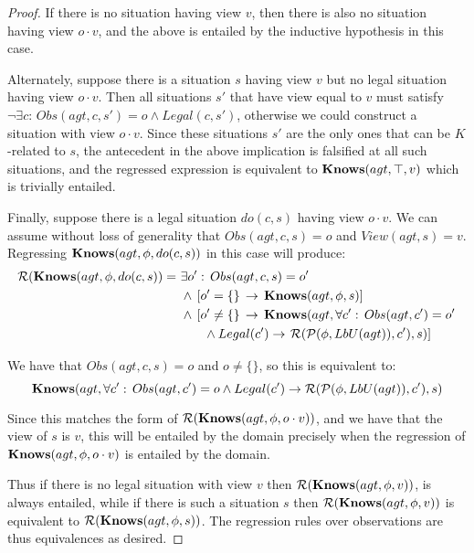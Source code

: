 \begin{proof}
If there is no situation having view $v$, then there is also no situation
having view $o\cdot v$, and the above is entailed by the inductive
hypothesis in this case.

Alternately, suppose there is a situation $s$ having view $v$ but
no legal situation having view $o\cdot v$. Then all situations $s'$
that have view equal to $v$ must satisfy $\neg\exists c:\, Obs(agt,c,s')=o\wedge Legal(c,s')$,
otherwise we could construct a situation with view $o\cdot v$. Since
these situations $s'$ are the only ones that can be $K$-related
to $s$, the antecedent in the above implication is falsified at all
such situations, and the regressed expression is equivalent to $\mathbf{Knows}(agt,\top,v)$
which is trivially entailed.

Finally, suppose there is a legal situation $do(c,s)$ having view
$o\cdot v$. We can assume without loss of generality that $Obs(agt,c,s)=o$
and $View(agt,s)=v$. Regressing $\mathbf{Knows}(agt,\phi,do(c,s))$ in this
case will produce:\begin{alignat*}{1}
\mathcal{R}(\mathbf{Knows}(agt,\phi,do(c,s))=\,\, & \exists o':\, Obs(agt,c,s)=o'\\
 & \wedge\,\left[o'=\{\}\,\rightarrow\,\mathbf{Knows}(agt,\phi,s)\right]\\
 & \wedge\,\left[o'\neq\{\}\,\rightarrow\,\mathbf{Knows}(agt,\forall c':\, Obs(agt,c')=o'\right.\\
 & \,\,\,\,\,\,\,\,\,\,\,\wedge Legal(c')\rightarrow\left.\mathcal{R}(\mathcal{P}(\phi,LbU(agt)),c'),s)\right]\end{alignat*}


We have that $Obs(agt,c,s)=o$ and $o\neq\{\}$, so this is equivalent
to:\[
\mathbf{Knows}(agt,\forall c':\, Obs(agt,c')=o\wedge Legal(c')\rightarrow\mathcal{R}(\mathcal{P}(\phi,LbU(agt)),c'),s)\]


Since this matches the form of $\mathcal{R}(\mathbf{Knows}(agt,\phi,o\cdot v))$,
and we have that the view of $s$ is $v$, this will be entailed by
the domain precisely when the regression of $\mathbf{Knows}(agt,\phi,o\cdot v)$
is entailed by the domain.

Thus if there is no legal situation with view $v$ then $\mathcal{R}(\mathbf{Knows}(agt,\phi,v))$,
is always entailed, while if there is such a situation $s$ then $\mathcal{R}(\mathbf{Knows}(agt,\phi,v))$
is equivalent to $\mathcal{R}(\mathbf{Knows}(agt,\phi,s))$. The regression rules
over observations are thus equivalences as desired. 
\end{proof}
\medskip{}


